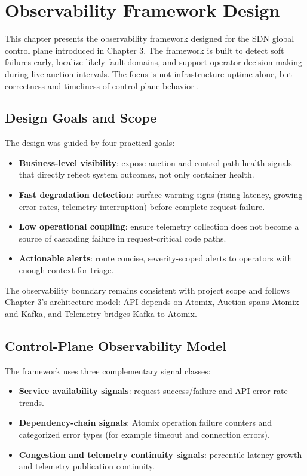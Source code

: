 \section{Observability Framework Design}

This chapter presents the observability framework designed for the SDN global control plane introduced in Chapter 3. The framework is built to detect soft failures early, localize likely fault domains, and support operator decision-making during live auction intervals. The focus is not infrastructure uptime alone, but correctness and timeliness of control-plane behavior \citep{majorsObservabilityEngineering2022}.

\subsection{Design Goals and Scope}

The design was guided by four practical goals:

\begin{itemize}
	\item \textbf{Business-level visibility}: expose auction and control-path health signals that directly reflect system outcomes, not only container health.
	\item \textbf{Fast degradation detection}: surface warning signs (rising latency, growing error rates, telemetry interruption) before complete request failure.
	\item \textbf{Low operational coupling}: ensure telemetry collection does not become a source of cascading failure in request-critical code paths.
	\item \textbf{Actionable alerts}: route concise, severity-scoped alerts to operators with enough context for triage.
\end{itemize}

The observability boundary remains consistent with project scope and follows Chapter 3's architecture model: API depends on Atomix, Auction spans Atomix and Kafka, and Telemetry bridges Kafka to Atomix.

\subsection{Control-Plane Observability Model}

The framework uses three complementary signal classes:

\begin{itemize}
	\item \textbf{Service availability signals}: request success/failure and API error-rate trends.
	\item \textbf{Dependency-chain signals}: Atomix operation failure counters and categorized error types (for example timeout and connection errors).
	\item \textbf{Congestion and telemetry continuity signals}: percentile latency growth and telemetry publication continuity.
\end{itemize}

